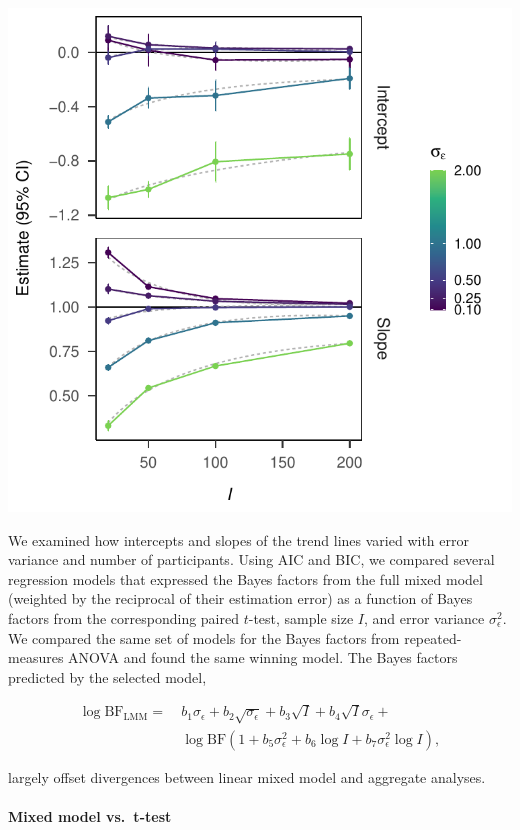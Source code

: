 \documentclass[
  a4paper,
  DIV=11,
  numbers=noendperiod,
  oneside]{scrartcl}
\let\oldparagraph\paragraph
\renewcommand{\paragraph}[1]{\oldparagraph{#1}\mbox{}}
\begin{document}
\includegraphics{prior_translation_files/figure-pdf/trend-plots-anova-exploration-2.pdf}

We examined how intercepts and slopes of the trend lines varied with
error variance and number of participants. Using AIC and BIC, we
compared several regression models that expressed the Bayes factors from
the full mixed model (weighted by the reciprocal of their estimation
error) as a function of Bayes factors from the corresponding paired
\(t\)-test, sample size \(I\), and error variance \(\sigma_\epsilon^2\).
We compared the same set of models for the Bayes factors from
repeated-measures ANOVA and found the same winning model. The Bayes
factors predicted by the selected model,

\[
\begin{aligned}
\log\mathrm{BF_{LMM}} = & ~ b_1 \sigma_\epsilon + b_2 \sqrt{\sigma_\epsilon} + b_3 \sqrt{I} + b_4 \sqrt{I} \sigma_\epsilon +\\
    & ~\log \mathrm{BF} (1 + b_5 \sigma_\epsilon^2 + b_6 \log I + b_7 \sigma_\epsilon^2 \log I),
\end{aligned}
\]

largely offset divergences between linear mixed model and aggregate
analyses.

\hypertarget{mixed-model-vs.-t-test-2}{%
\paragraph{Mixed model vs.~t-test}\label{mixed-model-vs.-t-test-2}}
\end{document}
